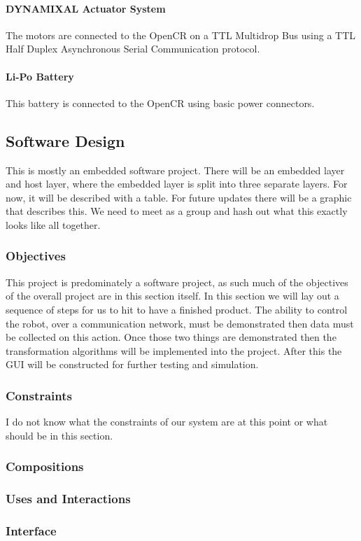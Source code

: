 \documentclass[english,12pt]{article}
\begin{document}
\paragraph{DYNAMIXAL Actuator System}
The motors are connected to the OpenCR on a TTL Multidrop Bus using a TTL Half Duplex Asynchronous
Serial Communication protocol.
\paragraph{Li-Po Battery}
This battery is connected to the OpenCR using basic power connectors.
\subsection{Software Design}
This is mostly an embedded software project. There will be an embedded layer and host layer, where
the embedded layer is split into three separate layers. For now, it will be described with a table. For
future updates there will be a graphic that describes this. We need to meet as a group and hash out
what this exactly looks like all together.
\subsubsection{Objectives}
This project is predominately a software project, as such much of the objectives of the overall project 
are in this section itself. In this section we will lay out a sequence of steps for us to hit to have a 
finished product. The ability to control the robot, over a communication network, must be demonstrated 
then data must be collected on this action. Once those two things are demonstrated then the transformation 
algorithms will be implemented into the project. After this the GUI will be constructed for further 
testing and simulation.
\subsubsection{Constraints}
I do not know what the constraints of our system are at this point or what should be in this
section.
\subsubsection{Compositions}
\subsubsection{Uses and Interactions}
\subsubsection{Interface}
\end{document}
